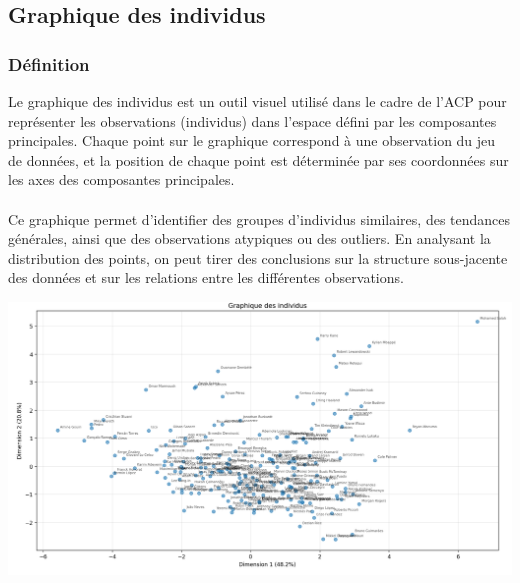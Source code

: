 \documentclass[12pt]{scrartcl}
\begin{document}

        \subsection{Graphique des individus}
            \subsubsection{Définition}
                Le graphique des individus est un outil visuel utilisé dans le cadre de l'ACP pour représenter les observations (individus) dans l'espace défini par les composantes principales. Chaque point sur le graphique correspond à une observation du jeu de données, et la position de chaque point est déterminée par ses coordonnées sur les axes des composantes principales.\\\\
                Ce graphique permet d'identifier des groupes d'individus similaires, des tendances générales, ainsi que des observations atypiques ou des outliers. En analysant la distribution des points, on peut tirer des conclusions sur la structure sous-jacente des données et sur les relations entre les différentes observations. 

                \begin{center}
                    \includegraphics[width=1\textwidth]{images/graphique_des_individus.png}
                \end{center}
\end{document}
